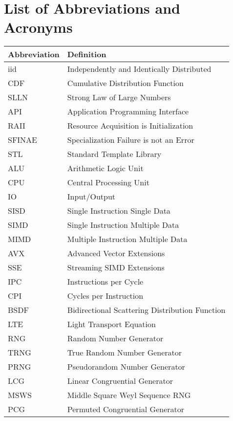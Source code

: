 \documentclass{stdlocal}
\begin{document}
  \section*{List of Abbreviations and Acronyms}

  \begin{table}[H]
    \center
    \renewcommand{\arraystretch}{1.3}
    \begin{tabularx}{\textwidth}{lX}
      \hline
      \textbf{Abbreviation} & \textbf{Definition} \\
      \hline
      \hline
      iid & Independently and Identically Distributed \\
      CDF & Cumulative Distribution Function \\
      SLLN & Strong Law of Large Numbers \\
      \hline
      API & Application Programming Interface \\
      RAII & Resource Acquisition is Initialization \\
      SFINAE & Specialization Failure is not an Error \\
      STL & Standard Template Library \\
      \hline
      ALU & Arithmetic Logic Unit \\
      CPU & Central Processing Unit \\
      IO & Input/Output \\
      SISD & Single Instruction Single Data \\
      SIMD & Single Instruction Multiple Data \\
      MIMD & Multiple Instruction Multiple Data \\
      AVX & Advanced Vector Extensions \\
      SSE & Streaming SIMD Extensions \\
      IPC & Instructions per Cycle \\
      CPI & Cycles per Instruction \\
      \hline
      BSDF & Bidirectional Scattering Distribution Function \\
      LTE & Light Transport Equation \\
      \hline
      RNG & Random Number Generator \\
      TRNG & True Random Number Generator \\
      PRNG & Pseudorandom Number Generator \\
      LCG & Linear Congruential Generator \\
      MSWS & Middle Square Weyl Sequence RNG \\
      PCG & Permuted Congruential Generator \\
      \hline
    \end{tabularx}
  \end{table}
\end{document}
